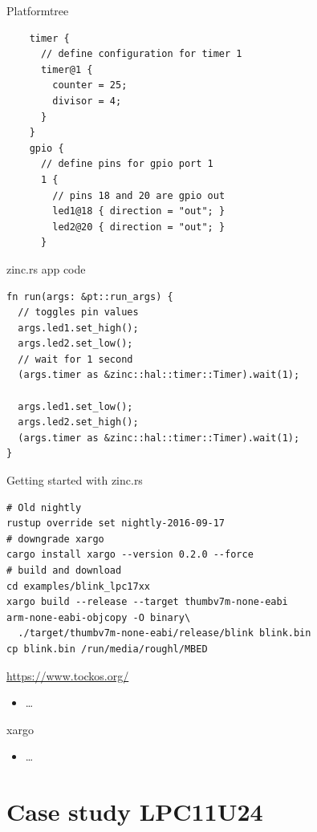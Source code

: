 \documentclass[aspectratio=1610,14pt,t]{beamer}
\begin{document}
\begin{frame}[c,fragile]{Platformtree}
  \begin{verbatim}
    timer {
      // define configuration for timer 1
      timer@1 {
        counter = 25;
        divisor = 4;
      }
    }
    gpio {
      // define pins for gpio port 1
      1 {
        // pins 18 and 20 are gpio out
        led1@18 { direction = "out"; }
        led2@20 { direction = "out"; }
      }
  \end{verbatim}
\end{frame}

\begin{frame}[c,fragile]{zinc.rs app code}
  \begin{verbatim}
fn run(args: &pt::run_args) {
  // toggles pin values
  args.led1.set_high();
  args.led2.set_low();
  // wait for 1 second
  (args.timer as &zinc::hal::timer::Timer).wait(1);

  args.led1.set_low();
  args.led2.set_high();
  (args.timer as &zinc::hal::timer::Timer).wait(1);
}
  \end{verbatim}
\end{frame}

\begin{frame}[fragile]{Getting started with zinc.rs}
  \begin{verbatim}
# Old nightly
rustup override set nightly-2016-09-17
# downgrade xargo
cargo install xargo --version 0.2.0 --force
# build and download
cd examples/blink_lpc17xx
xargo build --release --target thumbv7m-none-eabi
arm-none-eabi-objcopy -O binary\
  ./target/thumbv7m-none-eabi/release/blink blink.bin
cp blink.bin /run/media/roughl/MBED
  \end{verbatim}
\end{frame}


\begin{frame}[c]{\url{https://www.tockos.org/}}
  \begin{itemize}
      \item \ldots
  \end{itemize}
\end{frame}

\begin{frame}[c]{xargo}
  \begin{itemize}
      \item \ldots
  \end{itemize}
\end{frame}

\section{Case study LPC11U24}
\end{document}
